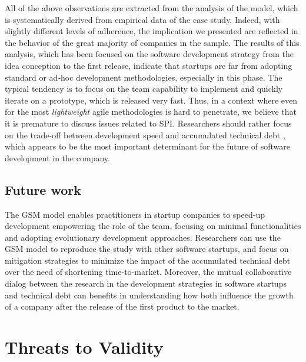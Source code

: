 \documentclass[10pt,journal,letterpaper,compsoc]{IEEEtran}
\begin{document}
All of the above observations are extracted from the analysis of the model, 
which is systematically derived from empirical data of the case study. Indeed, 
with slightly different levels of adherence, the implication we presented are 
reflected in the behavior of the great majority of companies in the sample. The 
results of this analysis, which has been focused on the software development 
strategy from the idea conception to the first release, indicate that startups 
are far from adopting standard or ad-hoc development methodologies, especially 
in this phase. The typical tendency is to focus on the team capability to 
implement and quickly iterate on a prototype, which is released very fast. Thus, 
in a context where even for the most \textit{lightweight} agile methodologies is 
hard to penetrate, we believe that it is premature to discuss issues related to 
SPI. Researchers should rather focus on the trade-off between development speed 
and accumulated technical debt \cite{Brown:2010:MTD:1882362.1882373}, which 
appears to be the most important determinant for the future of 
software development in the company.

\subsection{Future work}
\label{futwork}

The GSM model enables practitioners in startup companies to speed-up 
development empowering the role of the team, focusing on minimal functionalities 
and adopting evolutionary development approaches. Researchers can use the GSM 
model to reproduce the study with other software startups, and focus on 
mitigation strategies to minimize the impact of the accumulated technical debt 
over the need of shortening time-to-market. Moreover, the  mutual collaborative 
dialog between the research in the development strategies in software startups 
and technical debt can benefits in understanding how both influence the growth 
of a company after the release of the first product to the market.

\section{Threats to Validity}
\label{valt}
\end{document}
